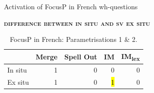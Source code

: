 \documentclass[lesson_slides]{subfiles}
\begin{document}
\begin{frame}{Activation of FocusP in French wh-questions}

    \noindent \textbf{\textsc{difference between in situ and sv ex situ}}
    \vspace*{2mm}
    \begin{table}[H]
    \centering
        \begin{tabular}{|l|r|r|r|r|}
        \hline
         & Merge & Spell Out & IM & IM\textsubscript{lex} \\
         \hline
        In situ & 1 & 0 & 0 & 0 \\
        \hline
        Ex situ & 1 & 0 & \hl{1} & 0 \\
        \hline
        \end{tabular}
    \caption{\label{tab:samp}FocusP in French: Parametrisations 1 \& 2.}
    \end{table}
    
    
\end{frame}
\end{document}
